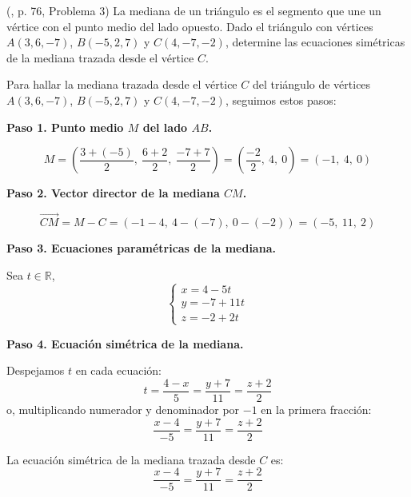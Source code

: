 \begin{prob} (\cite{espinoza2006Algebralineal}, p. 76, Problema 3) La mediana de un triángulo es el segmento que une un vértice con el punto medio del lado opuesto. Dado el triángulo con vértices $A(3,6,-7)$, $B(-5,2,7)$ y $C(4,-7,-2)$, determine las ecuaciones simétricas de la mediana trazada desde el vértice $C$. 

\begin{myproof}
Para hallar la mediana trazada desde el vértice $C$ del triángulo de vértices $A(3,6,-7)$, $B(-5,2,7)$ y $C(4,-7,-2)$, seguimos estos pasos:

\textbf{Paso 1. Punto medio $M$ del lado $AB$.}

\[
M = \left( \frac{3 + (-5)}{2},\ \frac{6 + 2}{2},\ \frac{-7 + 7}{2} \right )
= \left( \frac{-2}{2},\ 4,\ 0 \right )
= (-1,\ 4,\ 0)
\]

\textbf{Paso 2. Vector director de la mediana $CM$.}

\[
\vec{CM} = M - C = (-1 - 4,\ 4 - (-7),\ 0 - (-2)) = (-5,\ 11,\ 2)
\]

\textbf{Paso 3. Ecuaciones paramétricas de la mediana.}

Sea $t \in \mathbb{R}$,
\[
\begin{cases}
x = 4 - 5t \\
y = -7 + 11t \\
z = -2 + 2t
\end{cases}
\]

\textbf{Paso 4. Ecuación simétrica de la mediana.}

Despejamos $t$ en cada ecuación:
\[
t = \frac{4 - x}{5} = \frac{y + 7}{11} = \frac{z + 2}{2}
\]
o, multiplicando numerador y denominador por $-1$ en la primera fracción:
\[
\frac{x - 4}{-5} = \frac{y + 7}{11} = \frac{z + 2}{2}
\]

La ecuación simétrica de la mediana trazada desde $C$ es:
\[
\boxed{
\frac{x - 4}{-5} = \frac{y + 7}{11} = \frac{z + 2}{2}
}
\]
\end{myproof}

\end{prob}

